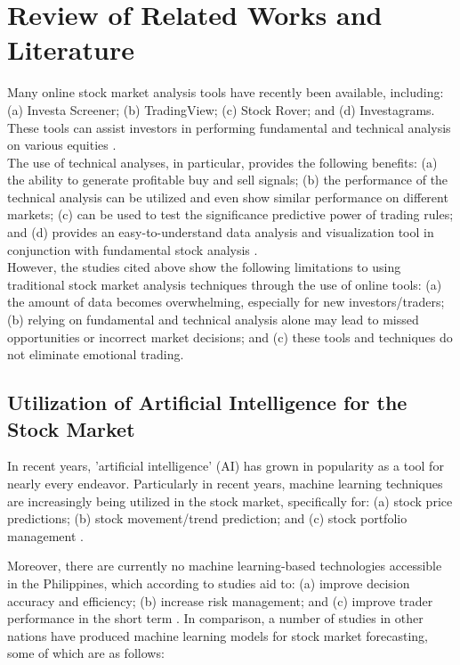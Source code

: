 \chapter{Review of Related Works and Literature}
\label{chap:lit_review}
Many online stock market analysis tools have recently been available, including: 
(a) Investa Screener; (b) TradingView; (c) Stock Rover; and (d) Investagrams. 
These tools can assist investors in performing fundamental and technical analysis on 
various equities
\cite{Benignos2020, Carey2023, DayTradingz, Investagrams}.
\\

The use of technical analyses, in particular, provides the following 
benefits: (a) the ability to generate profitable buy and sell signals; (b) the performance 
of the technical analysis can be utilized and even show similar performance on different 
markets; (c) can be used to test the significance predictive power of trading rules; and 
(d) provides an easy-to-understand data analysis and visualization tool in conjunction 
with fundamental stock analysis
\cite{Abbad2014AdvantagesOU, Priatmojo2022TechnicalAT, Ausloos_2002, Tangsripairoj2020StockifyAW}.
\\

However, the studies cited above show the following limitations to using 
traditional stock market analysis techniques through the use of online tools: 
(a) the amount of data becomes overwhelming, especially for new investors/traders; 
(b) relying on fundamental and technical analysis alone may lead to missed 
opportunities or incorrect market decisions; and (c) these tools and techniques 
do not eliminate emotional trading.
\\

\section{Utilization of Artificial Intelligence for the Stock Market}
\label{sec:util_ai}
In recent years, 'artificial intelligence' (AI) has grown in popularity as a tool 
for nearly every endeavor. Particularly in recent years, machine learning techniques 
are increasingly being utilized in the stock market, specifically for: 
(a) stock price predictions; (b) stock movement/trend prediction; and 
(c) stock portfolio management
\cite{Kumbure2022, Strader2020, Soni2022, Rea2020, Guo2022, Budiharto2021}. 

Moreover, there are currently no machine learning-based technologies accessible in the 
Philippines, which according to studies aid to: (a) improve decision accuracy and efficiency; 
(b) increase risk management; and (c) improve trader performance in the short term
\cite{Lu2022MachineLI, Shaheen2020UseOM, Singh_2022, Prasad2021ImportanceOM, 
Zhang2022ApplicationOB, Obthong2020}. In comparison, a number of studies in other nations have 
produced machine learning models for stock market forecasting, some of which are as follows:
\\

